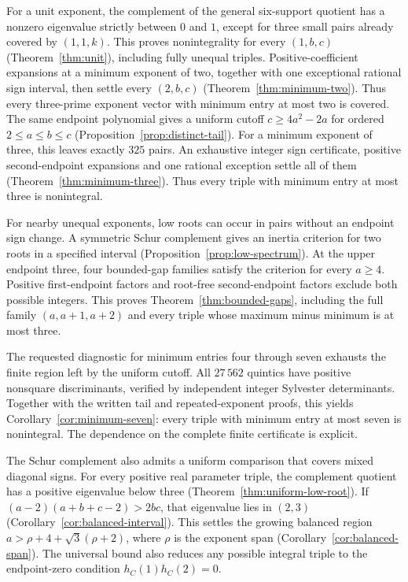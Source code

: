 For a unit exponent, the complement of the general six-support quotient
has a nonzero eigenvalue strictly between $0$ and $1$, except for three
small pairs already covered by $(1,1,k)$. This proves nonintegrality for
every $(1,b,c)$ (Theorem~\ref{thm:unit}), including fully unequal triples.
Positive-coefficient expansions at a minimum exponent of two, together
with one exceptional rational sign interval, then settle every
$(2,b,c)$ (Theorem~\ref{thm:minimum-two}). Thus every three-prime exponent
vector with minimum entry at most two is covered. The same endpoint
polynomial gives a uniform cutoff $c\geq4a^2-2a$ for ordered
$2\leq a\leq b\leq c$ (Proposition~\ref{prop:distinct-tail}).
For a minimum exponent of three, this leaves exactly $325$ pairs.
An exhaustive integer sign certificate, positive second-endpoint
expansions and one rational exception settle all of them
(Theorem~\ref{thm:minimum-three}). Thus every triple with minimum
entry at most three is nonintegral.

For nearby unequal exponents, low roots can occur in pairs without an
endpoint sign change. A symmetric Schur complement gives an inertia
criterion for two roots in a specified interval
(Proposition~\ref{prop:low-spectrum}). At the upper endpoint three,
four bounded-gap families satisfy the criterion for every $a\geq4$.
Positive first-endpoint factors and root-free second-endpoint factors
exclude both possible integers. This proves
Theorem~\ref{thm:bounded-gaps}, including the full family
$(a,a+1,a+2)$ and every triple whose maximum minus minimum is at most three.

The requested diagnostic for minimum entries four through seven exhausts
the finite region left by the uniform cutoff. All $27\,562$ quintics have
positive nonsquare discriminants, verified by independent integer
Sylvester determinants. Together with the written tail and repeated-exponent
proofs, this yields Corollary~\ref{cor:minimum-seven}: every triple with
minimum entry at most seven is nonintegral. The dependence on the complete
finite certificate is explicit.

The Schur complement also admits a uniform comparison that covers mixed
diagonal signs. For every positive real parameter triple,
the complement quotient has a positive eigenvalue below three
(Theorem~\ref{thm:uniform-low-root}). If
$(a-2)(a+b+c-2)>2bc$, that eigenvalue lies in $(2,3)$
(Corollary~\ref{cor:balanced-interval}). This settles the growing
balanced region $a>\rho+4+\sqrt3(\rho+2)$, where $\rho$ is the
exponent span (Corollary~\ref{cor:balanced-span}).
The universal bound also reduces any possible integral triple
to the endpoint-zero condition $h_C(1)h_C(2)=0$.

